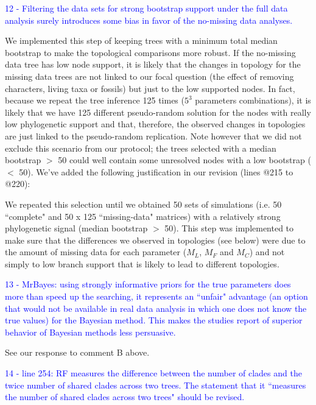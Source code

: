 \documentclass[11pt]{letter}
\begin{document}
\begin{letter}{}

\textcolor{blue}{12 - Filtering the data sets for strong bootstrap support under the full data analysis surely introduces some bias in favor of the no-missing data analyses.}

We implemented this step of keeping trees with a minimum total median bootstrap to make the topological comparisons more robust. If the no-missing data tree has low node support, it is likely that the changes in topology for the missing data trees are not linked to our focal question (the effect of removing characters, living taxa or fossils) but just to the low supported nodes. In fact, because we repeat the tree inference 125 times ($5^3$ parameters combinations), it is likely that we have 125 different pseudo-random solution for the nodes with really low phylogenetic support and that, therefore, the observed changes in topologies are just linked to the pseudo-random replication. Note however that we did not exclude this scenario from our protocol; the trees selected with a median bootstrap $>$ 50 could well contain some unresolved nodes with a low bootstrap ($<$ 50). We've added the following justification in our revision (lines @215 to @220):

\hfill\begin{minipage}{\dimexpr\textwidth-1cm}
We repeated this selection until we obtained 50 sets of simulations (i.e. 50 ``complete" and 50 x 125 ``missing-data" matrices) with a relatively strong phylogenetic signal (median bootstrap $>$ 50). This step was implemented to make sure that the differences we observed in topologies (see below) were due to the amount of missing data for each parameter ($M_L$, $M_F$ and $M_C$) and not simply to low branch support that is likely to lead to different topologies.
\end{minipage}


\textcolor{blue}{13 - MrBayes: using strongly informative priors for the true parameters does more than speed up the searching, it represents an ``unfair" advantage (an option that would not be available in real data analysis in which one does not know the true values) for the Bayesian method. This makes the studies report of superior behavior of Bayesian methods less persuasive.}

See our response to comment B above.


\textcolor{blue}{14 - line 254: RF measures the difference between the number of clades and the twice number of shared clades across two trees. The statement that it ``measures the number of shared clades across two trees" should be revised.}


\end{letter}
\end{document}
